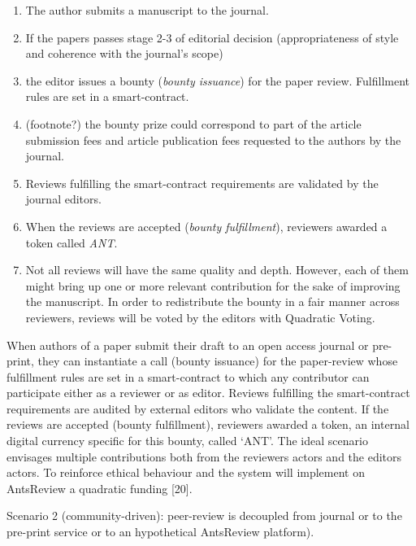 \documentclass[runningheads]{llncs}
\begin{document}
\begin{enumerate}
    \item The author submits a manuscript to the journal.
    \item If the papers passes stage 2-3 of editorial decision (appropriateness of style and coherence with the journal's scope)
    \item the editor issues a bounty (\emph{bounty issuance}) for the paper review. Fulfillment rules are set in a smart-contract.
    \item (footnote?) the bounty prize could correspond to part of the article submission fees and article publication fees requested to the authors by the journal.
    \item Reviews fulfilling the smart-contract requirements are validated by the journal editors.
    \item When the reviews are accepted (\emph{bounty fulfillment}), reviewers awarded a token called \emph{ANT}.
    \item Not all reviews will have the same quality and depth. However, each of them might bring up one or more relevant contribution for the sake of improving the manuscript. In order to redistribute the bounty in a fair manner across reviewers, reviews will be voted by the editors with Quadratic Voting. 
\end{enumerate}
When authors of a paper submit their draft to an open access journal or pre-print, they can instantiate a call (bounty issuance) for the paper-review whose fulfillment rules are set in a smart-contract to which any contributor can participate either as a reviewer or as editor. Reviews fulfilling the smart-contract requirements are audited by external editors who validate the content. If the reviews are accepted (bounty fulfillment), reviewers awarded a token, an internal digital currency specific for this bounty, called ‘ANT’. The ideal scenario envisages multiple contributions both from the reviewers actors and the editors actors. To reinforce ethical behaviour and the system will implement on AntsReview a quadratic funding [20].

Scenario 2 (community-driven): peer-review is decoupled from journal
or to the pre-print service or to an hypothetical AntsReview platform).
\end{document}
